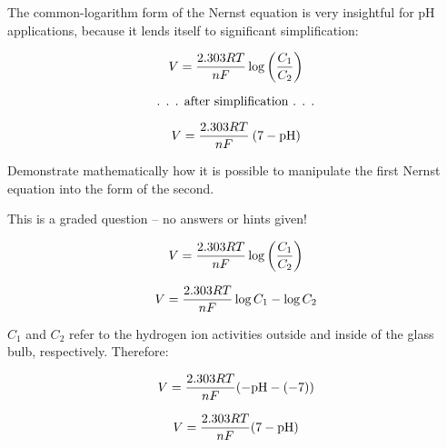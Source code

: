 

The common-logarithm form of the Nernst equation is very insightful for pH applications, because it lends itself to significant simplification:

$$V = {{2.303 R T} \over {nF}} \log \left({C_1 \over C_2}\right)$$

$$\hbox{. . . after simplification . . .}$$

$$V = {{2.303 R T} \over {nF}} \> (7 - \hbox{pH})$$

\vskip 10pt

Demonstrate mathematically how it is possible to manipulate the first Nernst equation into the form of the second.

\vfil 

\eject






This is a graded question -- no answers or hints given!







$$V = {{2.303 R T} \over {nF}} \log \left({C_1 \over C_2}\right)$$

$$V = {{2.303 R T} \over {nF}} \log C_1 - \log C_2$$

$C_1$ and $C_2$ refer to the hydrogen ion activities outside and inside of the glass bulb, respectively.  Therefore:

$$V = {{2.303 R T} \over {nF}} ( -\hbox{pH} - (-7))$$

$$V = {{2.303 R T} \over {nF}} (7 -\hbox{pH})$$





